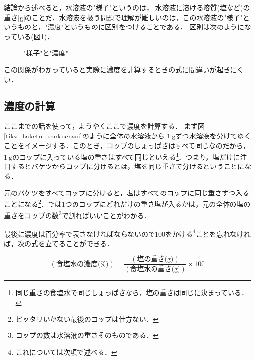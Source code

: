 \documentclass[dvipdfmx]{jsarticle}
\begin{document}
    結論から述べると，水溶液の"様子"というのは，
    水溶液に溶ける溶質(塩など)の重さ[\(\mathrm{g}\)]のことだ．水溶液を扱う問題で理解が難しいのは，この水溶液の"様子"というものと，"濃度"というものに区別をつけることである．
    区別は次のようになっている(図\ref{tikz_yosu_nodo})．

    \begin{figure}[htbp]\centering
        \caption{"様子"と"濃度"}
        \label{tikz_yosu_nodo}
    \end{figure}

    この関係がわかっていると実際に濃度を計算するときの式に間違いが起きにくい．

    \subsection{濃度の計算}
    ここまでの話を使って，ようやくここで濃度を計算する．
    まず図\ref{tikz_baketu_shokuensui}のように全体の水溶液から \(1\ \mathrm{{g}}\)ずつ水溶液を分けてゆくことをイメージする．このとき，コップのしょっぱさはすべて同じなのだから， \(1\ \mathrm{g}\)のコップに入っている塩の重さはすべて同じといえる\footnote{同じ重さの食塩水で同じしょっぱさなら，塩の重さは同じに決まっている．}．つまり，塩だけに注目するとバケツからコップに分けるとは，塩を同じ重さで分けるということになる．

    元のバケツをすべてコップに分けると，塩はすべてのコップに同じ重さずつ入ることになる\footnote{ピッタリいかない最後のコップは仕方ない．}．では1つのコップにどれだけの重さ塩が入るかは，元の全体の塩の重さをコップの数\footnote{コップの数は水溶液の重さそのものである．}で割ればいいことがわかる．


    最後に濃度は百分率で表さなければならないので100をかける\footnote{これについては次項で述べる．}ことを忘れなければ，次の式を立てることができる．

    \begin{equation}
        (\text{食塩水の濃度(\%)}) = \frac{(\text{塩の重さ(g)})}{(\text{食塩水の重さ(g)})}\times 100
    \end{equation}
\end{document}
